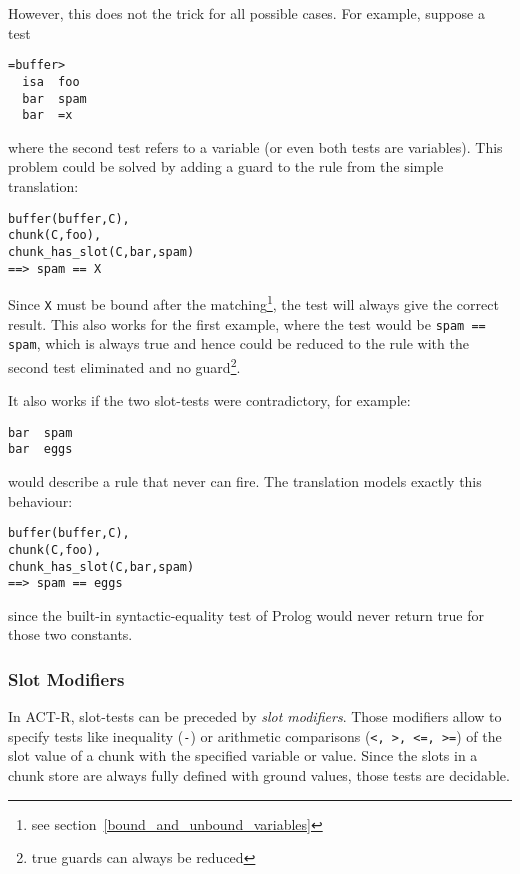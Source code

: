 However, this does not the trick for all possible cases. For example, suppose a test

\begin{lstlisting}
=buffer>
  isa  foo
  bar  spam
  bar  =x
\end{lstlisting}

where the second test refers to a variable (or even both tests are variables). This problem could be solved by adding a guard to the rule from the simple translation:

\begin{lstlisting}
buffer(buffer,C),
chunk(C,foo),
chunk_has_slot(C,bar,spam)
==> spam == X
\end{lstlisting}

Since \verb|X| must be bound after the matching\footnote{see section~\ref{bound_and_unbound_variables}}, the test will always give the correct result. This also works for the first example, where the test would be \verb|spam == spam|, which is always true and hence could be reduced to the rule with the second test eliminated and no guard\footnote{true guards can always be reduced}.

It also works if the two slot-tests were contradictory, for example: 

\begin{lstlisting}
bar  spam
bar  eggs
\end{lstlisting}

would describe a rule that never can fire. The translation models exactly this behaviour:

\begin{lstlisting}
buffer(buffer,C),
chunk(C,foo),
chunk_has_slot(C,bar,spam)
==> spam == eggs
\end{lstlisting}

since the built-in syntactic-equality test of Prolog would never return true for those two constants.

\subsubsection{Slot Modifiers}
\label{slot_modifiers}

In ACT-R, slot-tests can be preceded by \emph{slot modifiers}. Those modifiers allow to specify tests like inequality (\verb|-|) or arithmetic comparisons (\verb|<, >, <=, >=|) of the slot value of a chunk with the specified variable or value. Since the slots in a chunk store are always fully defined with ground values, those tests are decidable.

